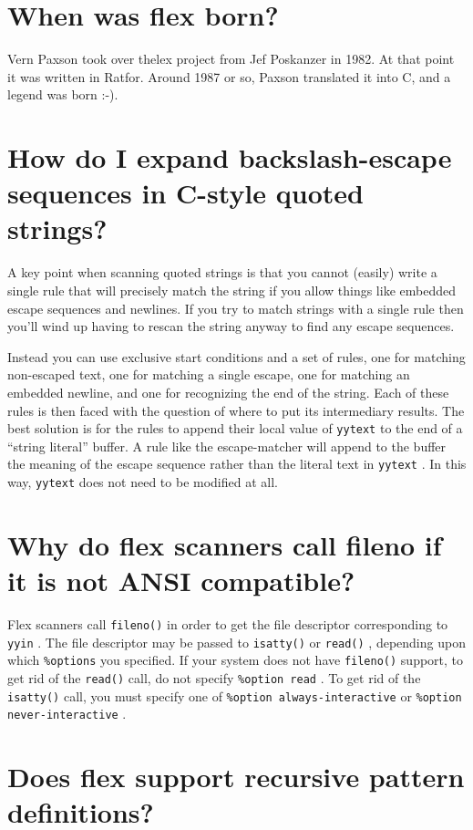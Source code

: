 \documentclass[openany,oneside]{book}
\begin{document}
\section{When was flex born?}


Vern Paxson took over
thelex project from Jef Poskanzer in 1982.  At that point it
was written in Ratfor.  Around 1987 or so, Paxson translated it into C, and
a legend was born :-).
\section{How do I expand backslash-escape sequences in C-style quoted strings?}


A key point when scanning quoted strings is that you cannot (easily) write
a single rule that will precisely match the string if you allow things
like embedded escape sequences and newlines.  If you try to match strings
with a single rule then you'll wind up having to rescan the string anyway
to find any escape sequences.

Instead you can use exclusive start conditions and a set of rules, one for
matching non-escaped text, one for matching a single escape, one for
matching an embedded newline, and one for recognizing the end of the
string.  Each of these rules is then faced with the question of where to
put its intermediary results.  The best solution is for the rules to
append their local value of \verb`yytext` to the end of a “string literal”
buffer.  A rule like the escape-matcher will append to the buffer the
meaning of the escape sequence rather than the literal text in \verb`yytext` . 
In this way, \verb`yytext` does not need to be modified at all.
\section{Why do flex scanners call fileno if it is not ANSI compatible?}


Flex scanners call \verb`fileno()` in order to get the file descriptor
corresponding to \verb`yyin` . The file descriptor may be passed to \verb`isatty()` or \verb`read()` , depending upon which \verb`%options` you specified. 
If your system does not have \verb`fileno()` support, to get rid of the \verb`read()` call, do not specify \verb`%option read` . To get rid of the \verb`isatty()` call, you must specify one of \verb`%option always-interactive` or \verb`%option never-interactive` .
\section{Does flex support recursive pattern definitions?}
\end{document}
